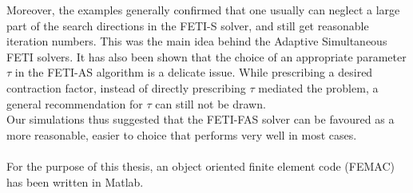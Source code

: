 Moreover, the examples generally confirmed that one usually can neglect a large part of the search directions in the FETI-S solver, and still get reasonable iteration numbers. This was the main idea behind the Adaptive Simultaneous FETI solvers. It has also been shown that the choice of an appropriate parameter $\tau$ in the FETI-AS algorithm is a delicate issue. While prescribing a desired contraction factor, instead of directly prescribing $\tau$ mediated the problem, a general recommendation for $\tau$ can still not be drawn.\\
Our simulations thus suggested that the FETI-FAS solver can be favoured as a more reasonable, easier to choice that performs very well in most cases.\\
\\
For the purpose of this thesis, an object oriented finite element code (FEMAC) has been written in Matlab\cite{FEMAC}.